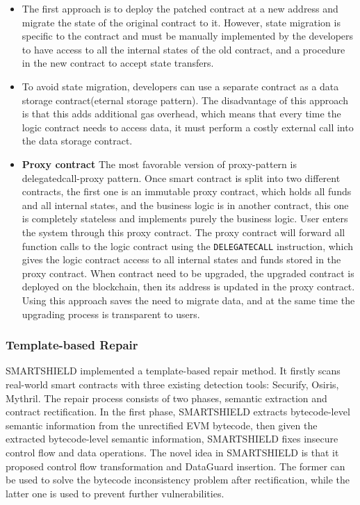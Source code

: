 \documentclass[sigplan,screen]{acmart}
\begin{document}
\begin{itemize}

\item The first approach is to deploy the patched contract at a new address and migrate the state of the original contract to it. However, state migration is specific to the contract and must be manually implemented by the developers to have access to all the internal states of the old contract, and a procedure in the new contract to accept state transfers.

\item To avoid state migration, developers can use a separate contract as a data storage contract(eternal storage pattern). The disadvantage of  this approach is that this adds additional gas overhead, which means that every time the logic contract needs to access data, it must perform a costly external call into the data storage contract.

\item  \textbf{Proxy contract} The most favorable version of proxy-pattern is delegatedcall-proxy pattern. Once smart contract is split into two different contracts, the first one is an immutable proxy contract, which holds all funds and all internal states, and the business logic is in another contract, this one is completely stateless and implements purely the business logic. User enters the system through this proxy contract. The proxy contract will forward all function calls to the logic contract using the \texttt{DELEGATECALL} instruction, which gives the logic contract access to all internal states and funds stored in the proxy contract. When contract need to be upgraded, the upgraded contract is deployed on the blockchain, then its address is updated in the proxy contract. Using this approach saves the need to migrate data, and at the same time the upgrading process is transparent to users.

\end{itemize}
\subsubsection{Template-based Repair}

SMARTSHIELD implemented a template-based repair method. It firstly scans real-world smart contracts with three existing detection tools: Securify, Osiris, Mythril. The repair process consists of two phases, semantic extraction and contract rectification. In the first phase, SMARTSHIELD extracts bytecode-level semantic information from the unrectified EVM bytecode, then given the extracted bytecode-level semantic information, SMARTSHIELD fixes insecure control flow and data operations. The novel idea in SMARTSHIELD is that it proposed control flow transformation and DataGuard insertion. The former can be used to solve the bytecode inconsistency problem after rectification, while the latter one is used to prevent further vulnerabilities.
\end{document}
